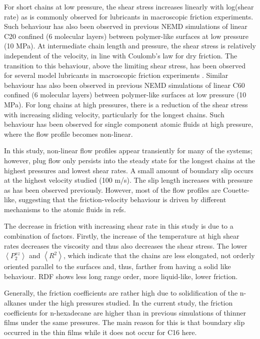 \documentclass[aps,prb,reprint,superscriptaddress, a4paper]{revtex4-1}
\begin{document}
For short chains at low pressure, the shear stress increases linearly with log(shear rate) as is commonly observed for lubricants in macroscopic friction experiments\cite{Ewen2017a}. Such behaviour has also been observed in previous NEMD simulations of linear C20 confined (6 molecular layers) between polymer-like surfaces at low pressure (10 MPa)\cite{Sivebaek2010}. At intermediate chain length and pressure, the shear stress is relatively independent of the velocity, in line with Coulomb's law for dry friction. The transition to this behaviour, above the limiting shear stress, has been observed for several model lubricants in macroscopic friction experiments \cite{Martinie2016a}. Similar behaviour has also been observed in previous NEMD simulations of linear C60 confined (6 molecular layers) between polymer-like surfaces at low pressure (10 MPa)\cite{Sivebaek2010}. For long chains at high pressures, there is a reduction of the shear stress with increasing sliding velocity, particularly for the longest chains. Such behaviour has been observed for single component atomic fluids at high pressure, where the flow profile becomes non-linear\cite{Heyes2012,Gattinoni2013,Mackowiak2016}.

In this study, non-linear flow profiles appear transiently for many of the systems; however, plug flow only persists into the steady state for the longest chains at the highest pressures and lowest shear rates. A small amount of boundary slip occurs at the highest velocity studied (100 m/s). The slip length increases with pressure as has been observed previously\cite{Ta2017}. However, most of the flow profiles are Couette-like, suggesting that the friction-velocity behaviour is driven by different mechanisms to the atomic fluids in refs\cite{Heyes2012,Gattinoni2013,Mackowiak2016}.

The decrease in friction with increasing shear rate in this study is due to a combination of factors. Firstly, the increase of the temperature at high shear rates decreases the viscosity and thus also decreases the shear stress. The lower $\left<P_{2}^{xz} \right> $ and $\left< R^2 \right>$, which indicate that the chains are less elongated, not orderly oriented parallel to the surfaces and, thus, farther from having a solid like behaviour. RDF shows less long range order, more liquid-like, lower friction.

Generally, the friction coefficients are rather high due to solidification of the n-alkanes under the high pressures studied. In the current study, the friction coefficients for n-hexadecane are higher than in previous simulations of thinner films under the same pressures\cite{Ta2017}. The main reason for this is that boundary slip occurred in the thin films while it does not occur for C16 here.
\end{document}
